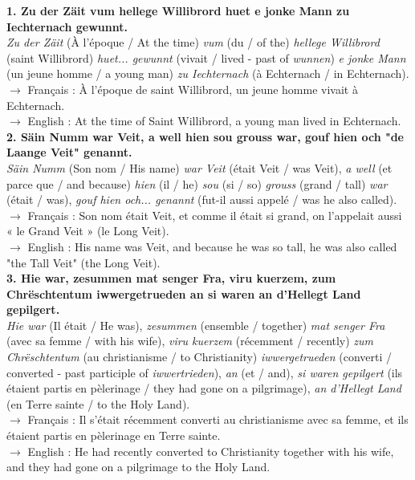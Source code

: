 \textbf{1. Zu der Zäit vum hellege Willibrord huet e jonke Mann zu Iechternach gewunnt.}\\
\textit{Zu der Zäit} (À l'époque / At the time) \textit{vum} (du / of the) \textit{hellege Willibrord} (saint Willibrord) \textit{huet... gewunnt} (vivait / lived - past of \textit{wunnen}) \textit{e jonke Mann} (un jeune homme / a young man) \textit{zu Iechternach} (à Echternach / in Echternach).\\
$\rightarrow$ Français : À l'époque de saint Willibrord, un jeune homme vivait à Echternach.\\
$\rightarrow$ English : At the time of Saint Willibrord, a young man lived in Echternach.\\[0.5em]

\textbf{2. Säin Numm war Veit, a well hien sou grouss war, gouf hien och "de Laange Veit" genannt.}\\
\textit{Säin Numm} (Son nom / His name) \textit{war Veit} (était Veit / was Veit), \textit{a well} (et parce que / and because) \textit{hien} (il / he) \textit{sou} (si / so) \textit{grouss} (grand / tall) \textit{war} (était / was), \textit{gouf hien och... genannt} (fut-il aussi appelé / was he also called).\\
$\rightarrow$ Français : Son nom était Veit, et comme il était si grand, on l'appelait aussi « le Grand Veit » (le Long Veit).\\
$\rightarrow$ English : His name was Veit, and because he was so tall, he was also called "the Tall Veit" (the Long Veit).\\[0.5em]

\textbf{3. Hie war, zesummen mat senger Fra, viru kuerzem, zum Chrëschtentum iwwergetrueden an si waren an d'Hellegt Land gepilgert.}\\
\textit{Hie war} (Il était / He was), \textit{zesummen} (ensemble / together) \textit{mat senger Fra} (avec sa femme / with his wife), \textit{viru kuerzem} (récemment / recently) \textit{zum Chrëschtentum} (au christianisme / to Christianity) \textit{iwwergetrueden} (converti / converted - past participle of \textit{iwwertrieden}), \textit{an} (et / and), \textit{si waren gepilgert} (ils étaient partis en pèlerinage / they had gone on a pilgrimage), \textit{an d'Hellegt Land} (en Terre sainte / to the Holy Land).\\
$\rightarrow$ Français : Il s'était récemment converti au christianisme avec sa femme, et ils étaient partis en pèlerinage en Terre sainte.\\
$\rightarrow$ English : He had recently converted to Christianity together with his wife, and they had gone on a pilgrimage to the Holy Land.\\[0.5em]

